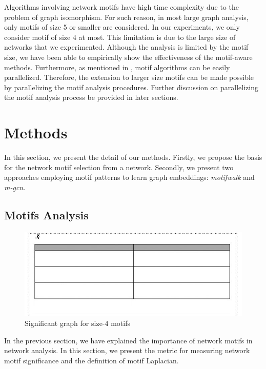 \documentclass{article}
\theoremstyle{definition}
\begin{document}
Algorithms involving network motifs have high time complexity due to
the problem of graph isomorphism. For such reason, in most large graph
analysis, only motifs of size 5 or smaller are considered. In our 
experiments, we only consider motif of size 4 at most. This limitation is 
due to the large size of networks that we experimented. Although the
analysis is limited by the motif size, we have been able to empirically 
show the effectiveness of the motif-aware methods. Furthermore, as 
mentioned in \cite{juremotif}, motif algorithms can be easily 
parallelized. Therefore, the extension to larger size motifs can be made 
possible by parallelizing the motif analysis procedures. Further 
discussion on parallelizing the motif analysis process be provided in 
later sections.

\section{Methods}

In this section, we present the detail of our methods. Firstly,
we propose the basis for the network motif selection from a network.
Secondly, we present two approaches employing motif patterns to
learn graph embeddings: \emph{motifwalk} and \emph{m-gcn}.

\subsection{Motifs Analysis}

\begin{figure} \label{fig:sigm4}
    \centering
    \includegraphics[width=0.9\linewidth]{foo_2col}
    \caption{Significant graph for size-4 motifs}
\end{figure}

In the previous section, we have explained the importance of
network motifs in network analysis. In this section, we present
the metric for measuring network motif significance and the definition
of motif Laplacian.
\end{document}

